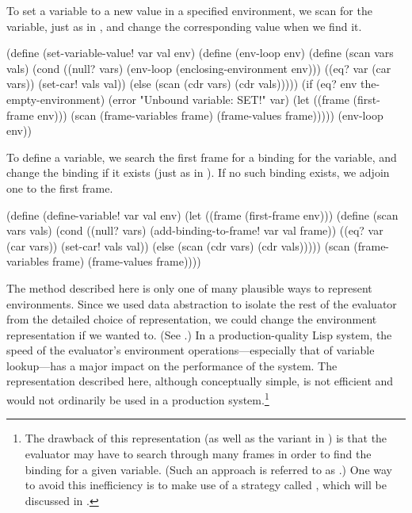 \noindent
To set a variable to a new value in a specified environment, we scan for the
variable, just as in , and change the corresponding
value when we find it.

\begin{codeBlock}
(define (set-variable-value! var val env)
  (define (env-loop env)
    (define (scan vars vals)
      (cond ((null? vars)
             (env-loop (enclosing-environment env)))
            ((eq? var (car vars)) (set-car! vals val))
            (else (scan (cdr vars) (cdr vals)))))
    (if (eq? env the-empty-environment)
        (error "Unbound variable: SET!" var)
        (let ((frame (first-frame env)))
          (scan (frame-variables frame)
                (frame-values frame)))))
  (env-loop env))
\end{codeBlock}

\noindent
To define a variable, we search the first frame for a binding for the variable,
and change the binding if it exists (just as in ).
If no such binding exists, we adjoin one to the first frame.

\begin{codeBlock}
(define (define-variable! var val env)
  (let ((frame (first-frame env)))
    (define (scan vars vals)
      (cond ((null? vars)
             (add-binding-to-frame! var val frame))
            ((eq? var (car vars)) (set-car! vals val))
            (else (scan (cdr vars) (cdr vals)))))
    (scan (frame-variables frame) (frame-values frame))))
\end{codeBlock}

\noindent
The method described here is only one of many plausible ways to represent
environments.  Since we used data abstraction to isolate the rest of the
evaluator from the detailed choice of representation, we could change the
environment representation if we wanted to.  (See .)  In a
production-quality Lisp system, the speed of the evaluator's environment
operations---especially that of variable lookup---has a major impact on the
performance of the system.  The representation described here, although
conceptually simple, is not efficient and would not ordinarily be used in a
production system.\footnote{The drawback of this representation (as well as the
variant in ) is that the evaluator may have to search
through many frames in order to find the binding for a given variable.  (Such
an approach is referred to as .)  One way to avoid this
inefficiency is to make use of a strategy called ,
which will be discussed in .}

